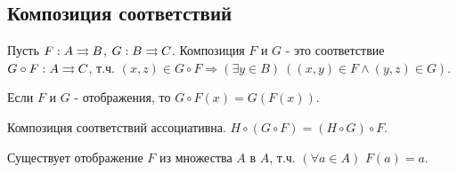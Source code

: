 \subsection{Композиция соответствий}
\begin{definition}
	Пусть $F: A \rightrightarrows B$, $G: B \rightrightarrows C$. Композиция $F$ и $G$ - это соответствие $G \circ F: A \rightrightarrows C$, т.ч. $(x, z) \in G \circ F \Rightarrow (\exists y \in B) \ ((x, y) \in F \land (y, z) \in G)$.
\end{definition}

\begin{note}
	Если $F$ и $G$ - отображения, то $G \circ F(x) = G(F(x))$.
\end{note}

\begin{note}
	Композиция соответствий ассоциативна. $H \circ (G \circ F) = (H \circ G) \circ F$.
\end{note}

\begin{definition}
	Существует отображение $F$ из множества $A$ в $A$, т.ч. $(\forall a \in A)$ $F(a) = a$.
\end{definition}